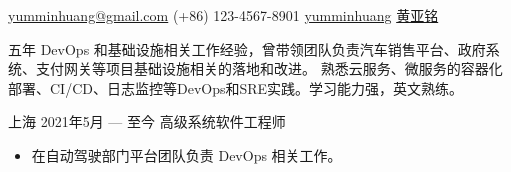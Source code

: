 \documentclass{resume}
\begin{document}
{\href{mailto:yumminhuang@gmail.com}{yumminhuang@gmail.com}}
{(+86) 123-4567-8901}
{\href{https://github.com/yumminhuang}{yumminhuang}}
{\href{https://www.linkedin.com/in/yaming-huang-6a09325b/zh-cn}{黄亚铭}}
{}


\begin{body}
五年 DevOps 和基础设施相关工作经验，曾带领团队负责汽车销售平台、政府系统、支付网关等项目基础设施相关的落地和改进。
熟悉云服务、微服务的容器化部署、CI/CD、日志监控等DevOps和SRE实践。学习能力强，英文熟练。
\smallskip
\end{body}


\begin{body}
	{上海}
	{2021年5月 --- 至今}
	{高级系统软件工程师}
	\begin{itemize}[noitemsep,topsep=0pt]
		\item 在自动驾驶部门平台团队负责 DevOps 相关工作。
	\end{itemize}
\end{body}
\end{document}
